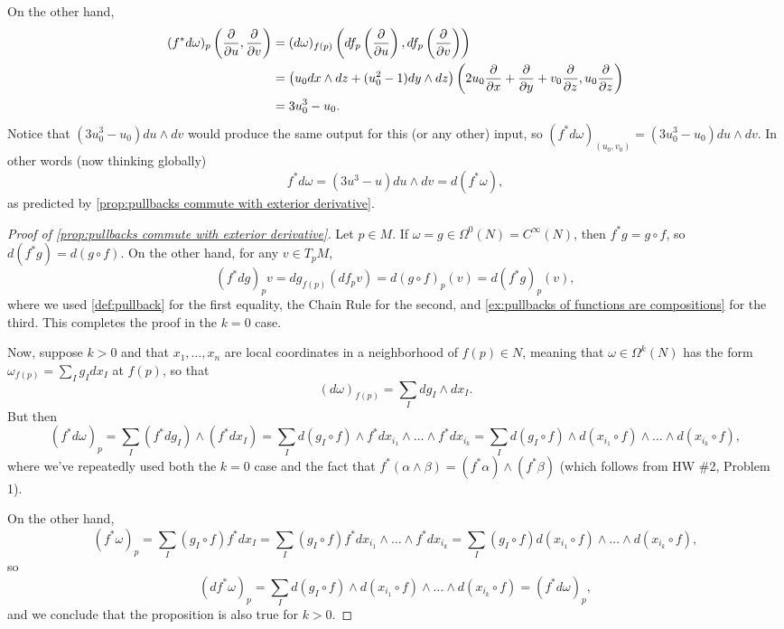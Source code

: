 \begin{example}
	On the other hand,
	\begin{align*}
		(f^\ast d\omega)_{p}\left(\frac{\partial}{\partial u}, \frac{\partial}{\partial v}\right) & = (d\omega)_{f(p)} \left(df_{p}\left(\frac{\partial}{\partial u}\right), df_p\left(\frac{\partial}{\partial v}\right)\right) \\
		 & = \left(\vphantom{x^2}u_0 dx \wedge dz + (u_0^2-1) dy \wedge dz\right)\left(2u_0 \frac{\partial}{\partial x} + \frac{\partial}{\partial y} + v_0\frac{\partial}{\partial z}, u_0\frac{\partial}{\partial z}\right) \\
		 & = 3u_0^3 -u_0.
	\end{align*}
	Notice that $(3u_0^3 -u_0)du \wedge dv $ would produce the same output for this (or any other) input, so $(f^\ast d\omega)_{(u_0,v_0)}= (3u_0^3 -u_0)du \wedge dv$. In other words (now thinking globally)
	\[
		f^\ast d\omega = (3u^3-u)du \wedge dv = d(f^\ast \omega),
	\]
	as predicted by \cref{prop:pullbacks commute with exterior derivative}.
\end{example}

\begin{proof}[Proof of \cref{prop:pullbacks commute with exterior derivative}]
	 Let $p \in M$. If $\omega = g\in \Omega^0(N) = C^\infty(N)$, then $f^\ast g = g \circ f$, so $d(f^\ast g ) = d(g \circ f)$. On the other hand, for any $v \in T_pM$, 
	 \[
	 	(f^\ast dg)_pv = dg_{f(p)}(df_p v) = d(g \circ f)_p(v) = d(f^\ast g)_p(v),
	 \]
	 where we used \cref{def:pullback} for the first equality, the Chain Rule for the second, and \cref{ex:pullbacks of functions are compositions} for the third. This completes the proof in the $k=0$ case.
	 
	 Now, suppose $k > 0$ and that $x_1, \dots , x_n$ are local coordinates in a neighborhood of $f(p) \in N$, meaning that $\omega \in \Omega^k(N)$ has the form $\omega_{f(p)} = \sum_I g_I dx_I$ at $f(p)$, so that
	 \[
	 	(d\omega)_{f(p)} = \sum_I dg_I \wedge dx_I.
	 \]
	 But then
	 \[
	 	(f^\ast d\omega)_p = \sum_I (f^\ast dg_I) \wedge (f^\ast dx_I) = \sum_I d(g_I \circ f) \wedge f^\ast dx_{i_1} \wedge \dots \wedge f^\ast dx_{i_k} = \sum_I d(g_I \circ f) \wedge d(x_{i_1} \circ f) \wedge \dots \wedge d(x_{i_k} \circ f),
	 \]
	 where we've repeatedly used both the $k=0$ case and the fact that $f^\ast(\alpha \wedge \beta) = (f^\ast \alpha) \wedge (f^\ast \beta)$ (which follows from HW \#2, Problem 1).
	 
	 On the other hand,
	 \[
	 	(f^\ast\omega)_p = \sum_I (g_I \circ f) f^\ast dx_I = \sum_I (g_I \circ f) f^\ast dx_{i_1} \wedge \dots \wedge f^\ast dx_{i_k} = \sum_I (g_I \circ f) d (x_{i_1} \circ f) \wedge \dots \wedge d(x_{i_k} \circ f),
	 \]
	 so
	 \[
	 	(df^\ast \omega)_p = \sum_I d(g_I \circ f) \wedge d (x_{i_1} \circ f) \wedge \dots \wedge d(x_{i_k} \circ f) = (f^\ast d\omega)_p,
	 \]
	 and we conclude that the proposition is also true for $k>0$.
\end{proof}